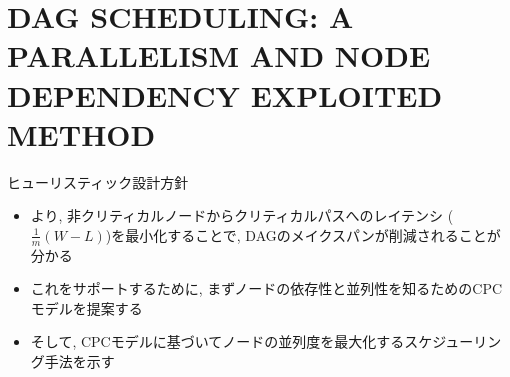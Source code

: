 
\section{DAG SCHEDULING: A PARALLELISM AND NODE DEPENDENCY EXPLOITED METHOD}
\label{sec: dag}

\begin{frame}{ヒューリスティック設計方針}
    \begin{itemize}
        \item {} より, 非クリティカルノードからクリティカルパスへのレイテンシ ($\frac{1}{m}(W-L)$)を最小化することで, DAGのメイクスパンが削減されることが分かる
        \item これをサポートするために, まずノードの依存性と並列性を知るためのCPCモデルを提案する
        \item そして, CPCモデルに基づいてノードの並列度を最大化するスケジューリング手法を示す
    \end{itemize}
\end{frame}

